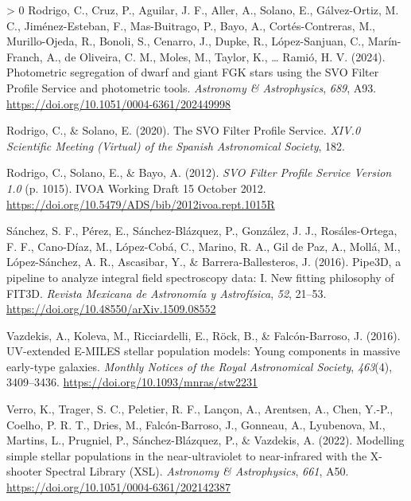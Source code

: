 \documentclass[10pt,a4paper,onecolumn]{article}
\newlength{\cslhangindent}
\newenvironment{CSLReferences}[3] %
 {%
  \setlength{\parindent}{0pt}
  \ifodd #1 \everypar{\setlength{\hangindent}{\cslhangindent}}\ignorespaces\fi
  \ifnum #2 > 0
  \setlength{\parskip}{#2\baselineskip}
  \fi
 }%
 {}
\begin{document}
\begin{CSLReferences}{1}{0}
\leavevmode\hypertarget{ref-rodrigo+24}{}%
Rodrigo, C., Cruz, P., Aguilar, J. F., Aller, A., Solano, E.,
G\'alvez-Ortiz, M. C., Jim\'enez-Esteban, F., Mas-Buitrago, P., Bayo, A.,
Cort\'es-Contreras, M., Murillo-Ojeda, R., Bonoli, S., Cenarro, J., Dupke,
R., L\'opez-Sanjuan, C., Mar\'in-Franch, A., de Oliveira, C. M., Moles, M.,
Taylor, K., \ldots{} Rami\'o, H. V. (2024). {Photometric segregation of
dwarf and giant FGK stars using the SVO Filter Profile Service and
photometric tools}. \emph{Astronomy \& Astrophysics}, \emph{689}, A93.
\url{https://doi.org/10.1051/0004-6361/202449998}

\leavevmode\hypertarget{ref-rodrigo+20}{}%
Rodrigo, C., \& Solano, E. (2020). {The SVO Filter Profile Service}.
\emph{XIV.0 Scientific Meeting (Virtual) of the Spanish Astronomical
Society}, 182.

\leavevmode\hypertarget{ref-rodrigo+12}{}%
Rodrigo, C., Solano, E., \& Bayo, A. (2012). \emph{{SVO Filter Profile
Service Version 1.0}} (p. 1015). IVOA Working Draft 15 October 2012.
\url{https://doi.org/10.5479/ADS/bib/2012ivoa.rept.1015R}

\leavevmode\hypertarget{ref-sanchez+16}{}%
S\'anchez, S. F., P\'erez, E., S\'anchez-Bl\'azquez, P., Gonz\'alez, J. J.,
Ros\'ales-Ortega, F. F., Cano-D\'iaz, M., L\'opez-Cob\'a, C., Marino, R. A., Gil
de Paz, A., Moll\'a, M., L\'opez-S\'anchez, A. R., Ascasibar, Y., \&
Barrera-Ballesteros, J. (2016). {Pipe3D}, a pipeline to analyze integral
field spectroscopy data: {I}. New fitting philosophy of {FIT3D}.
\emph{Revista Mexicana de Astronom\'ia y Astrof\'isica}, \emph{52}, 21--53.
\url{https://doi.org/10.48550/arXiv.1509.08552}

\leavevmode\hypertarget{ref-vazdekis+16}{}%
Vazdekis, A., Koleva, M., Ricciardelli, E., Röck, B., \& Falc\'on-Barroso,
J. (2016). {UV}-extended {E-MILES} stellar population models: Young
components in massive early-type galaxies. \emph{Monthly Notices of the
Royal Astronomical Society}, \emph{463}(4), 3409--3436.
\url{https://doi.org/10.1093/mnras/stw2231}

\leavevmode\hypertarget{ref-verro+22}{}%
Verro, K., Trager, S. C., Peletier, R. F., Lançon, A., Arentsen, A.,
Chen, Y.-P., Coelho, P. R. T., Dries, M., Falc\'on-Barroso, J., Gonneau,
A., Lyubenova, M., Martins, L., Prugniel, P., S\'anchez-Bl\'azquez, P., \&
Vazdekis, A. (2022). {Modelling simple stellar populations in the
near-ultraviolet to near-infrared with the X-shooter Spectral Library
(XSL)}. \emph{Astronomy \& Astrophysics}, \emph{661}, A50.
\url{https://doi.org/10.1051/0004-6361/202142387}


\end{CSLReferences}
\end{document}
